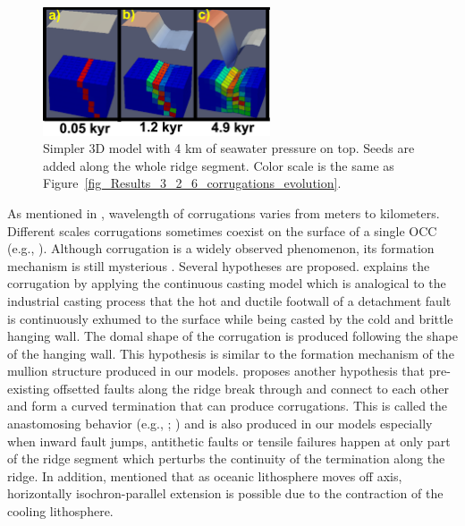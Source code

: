 \begin{figure}[h]
  \centering
    \includegraphics[width=0.6\textwidth]{./Figures/fig_Discussion_Observation_6_Corrugation_simplerModel_4kwaterdepth_along_ridge_seed.eps}
  \caption[Simpler 3D model with 4 km of seawater pressure on top. Seeds are added along the whole ridge segment.]{Simpler 3D model with 4 km of seawater pressure on top. Seeds are added along the whole ridge segment. Color scale is the same as Figure~\hyperref[fig_Results_3_2_6_corrugations_evolution]{\ref{fig_Results_3_2_6_corrugations_evolution}}.}
 \label{fig_Discussion_Observation_6_Corrugation_simplerModel_4kwaterdepth_along_ridge_seed}
\end{figure}   

As mentioned in \citet{Smith2014}, wavelength of corrugations varies from meters to kilometers. Different scales corrugations sometimes coexist on the surface of a single OCC (e.g., \citealp{MacLeod2009}). Although corrugation is a widely observed phenomenon, its formation mechanism is still mysterious \citep{Smith2006}. Several hypotheses are proposed. \citet{Spencer1999} explains the corrugation by applying the continuous casting model which is analogical to the industrial casting process that the hot and ductile footwall of a detachment fault is continuously exhumed to the surface while being casted by the cold and brittle hanging wall. The domal shape of the corrugation is produced following the shape of the hanging wall. This hypothesis is similar to the formation mechanism of the mullion structure produced in our models. \citet{Smith2014} proposes another hypothesis that pre-existing offsetted faults along the ridge break through and connect to each other and form a curved termination that can produce corrugations. This is called the anastomosing behavior (e.g., \citealp{Ferrill1999}; \citealp{Wong2008}) and is also produced in our models especially when inward fault jumps, antithetic faults or tensile failures happen at only part of the ridge segment which perturbs the continuity of the termination along the ridge. In addition, \citet{Tucholke1998} mentioned that %
as oceanic lithosphere moves off axis, horizontally isochron-parallel extension is possible due to the contraction of the cooling lithosphere.

